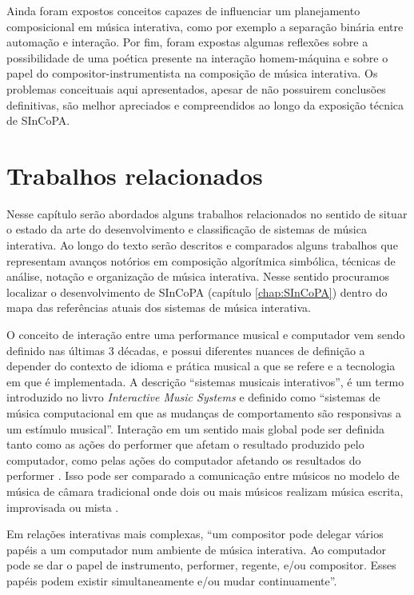 \documentclass{ppgmus}
\begin{document}
Ainda foram expostos conceitos capazes de influenciar um planejamento
composicional em música interativa, como por exemplo a separação binária entre
automação e interação. Por fim, foram expostas algumas reflexões sobre a
possibilidade de uma poética presente na interação homem-máquina e sobre
o papel do compositor-instrumentista na composição de música interativa.
Os problemas conceituais aqui apresentados, apesar de não possuirem
conclusões definitivas, são melhor apreciados e compreendidos ao longo
da exposição técnica de SInCoPA.



\chapter{Trabalhos relacionados}
\label{sec:rev}


Nesse capítulo serão abordados alguns trabalhos relacionados no sentido
de situar o estado da arte do desenvolvimento e classificação
de sistemas de música interativa. Ao longo do texto serão descritos e comparados alguns trabalhos
que representam avanços notórios em composição algorítmica simbólica, 
técnicas de análise, notação e organização de música interativa.
Nesse sentido procuramos localizar o desenvolvimento de SInCoPA (capítulo \ref{chap:SInCoPA})
dentro do mapa das referências atuais dos sistemas de música interativa.



O conceito de interação entre uma performance musical e computador vem
sendo definido nas últimas 3 décadas, e possui diferentes nuances de definição
a depender do contexto de idioma e prática musical a que se refere e a tecnologia
em que é implementada. A descrição ``sistemas musicais interativos'', é um
termo introduzido no livro \textit{Interactive Music Systems} 
\cite{rowe93:interactive} e definido como ``sistemas de música 
computacional em que as mudanças de comportamento são responsivas a um
estímulo musical''. Interação em um sentido mais global pode ser definida
tanto como as ações do performer que afetam o resultado produzido pelo computador, como pelas ações do computador
afetando os resultados do performer \cite{garnett:2001}.
Isso pode ser comparado a comunicação entre músicos no modelo de  música de 
câmara tradicional onde dois ou mais músicos realizam música escrita, improvisada 
ou mista \cite{winkler93:interactive}.

Em relações interativas mais complexas, ``um compositor pode
delegar vários papéis a um computador num ambiente de música interativa. Ao
computador pode se dar o papel de instrumento, performer, regente, e/ou compositor.
Esses papéis podem existir  simultaneamente e/ou mudar continuamente''\cite{lippe:2002}.
\end{document}
